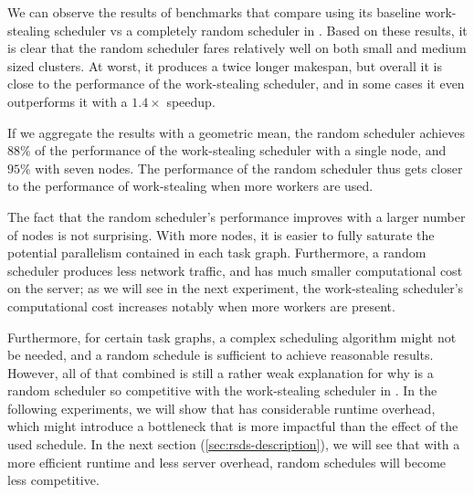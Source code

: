 We can observe the results of benchmarks that compare \dask{} using its
baseline work-stealing scheduler vs a completely random scheduler in .
Based on these results, it is clear that the random scheduler fares relatively well on both small
and medium sized clusters. At worst, it produces a twice longer makespan, but overall it is
close to the performance of the work-stealing scheduler, and in some cases it even outperforms it
with a $1.4\times$ speedup.

If we aggregate the results with a geometric mean, the random scheduler achieves
$88\%$ of the performance of the work-stealing scheduler with a single node,
and $95\%$ with seven nodes. The performance of the random scheduler thus gets
closer to the performance of work-stealing when more workers are used.

The fact that the random scheduler's performance improves with a larger number of nodes is not
surprising. With more nodes, it is easier to fully saturate the potential parallelism contained in
each task graph. Furthermore, a random scheduler produces less network traffic, and has much
smaller computational cost on the server; as we will see in the next experiment, the work-stealing
scheduler's computational cost increases notably when more workers are present.

Furthermore, for certain task graphs, a complex scheduling algorithm might not be needed, and a
random schedule is sufficient to achieve reasonable results. However, all of that combined is still
a rather weak explanation for why is a random scheduler so competitive with the work-stealing
scheduler in \dask{}. In the following experiments, we will show that
\dask{} has considerable runtime overhead, which might introduce a bottleneck
that is more impactful than the effect of the used schedule. In the next section
(\ref{sec:rsds-description}), we will see that with a more efficient runtime and less server
overhead, random schedules will become less competitive.


